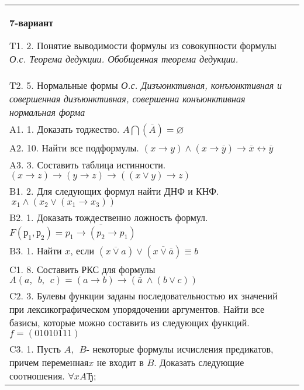 \documentclass{article}
\begin{document}
\begin{tabular}{m{17cm}}
\textbf{7-вариант}
\newline

T1. 2. Понятие выводимости формулы из совокупности формулы \emph{О.с. Теорема дедукции. Обобщенная теорема дедукции.} \\
T2. 5. Нормальные формы \emph{О.с. Дизъюнктивная, конъюнктивная и совершенная дизъюнктивная, совершенна конъюнктивная нормальная форма} \\
A1. 1. Доказать тоджество. \(A\bigcap(\overline{A}) = \varnothing\) \\
A2. 10. Найти все подформулы. \((x \rightarrow y) \land (x \rightarrow \overline{y}) \rightarrow \overline{x} \leftrightarrow \overline{y}\) \\
A3. 3. Составить таблица истинности. \((x \rightarrow z) \rightarrow (y \rightarrow z) \rightarrow ((x \vee y) \rightarrow z)\) \\
B1. 2. Для следующих формул найти ДНФ и КНФ. \(\ x_{1} \land (x_{2} \vee (x_{1} \rightarrow x_{3}))\) \\
B2. 1. Доказать тождественно ложность формул. \(F\left( р_{1},р_{2} \right) = \overline{p_{1} \rightarrow (p_{2} \rightarrow p_{1})}\) \\
B3. 1. Найти \(x\), если \(\left( \overline{x \vee a} \right) \vee \left( \overline{x \vee \overline{a}} \right) \equiv b\) \\
C1. 8. Составить РКС для формулы \(A(a,\ \ b,\ \ c) = (a \rightarrow b) \rightarrow (\overline{a}\  \land (b \vee c))\) \\
C2. 3. Булевы функции заданы последовательностью их значений при лексикографическом упорядочении аргументов. Найти все базисы, которые можно составить из следующих функций. \(f = (01010111)\) \\
C3. 1. Пусть \(A,\ \ B\)- некоторые формулы исчисления предикатов, причем переменная\(x\) не входит в \(B\). Доказать следующие соотношения. \(\forall xAЂ\); \\

\end{tabular}
\vspace{1cm}
\end{document}
